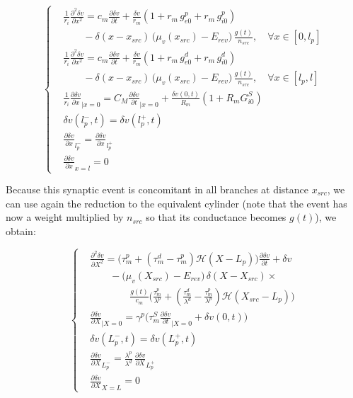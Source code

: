\documentclass[colorlinks]{article}
\begin{document}
\begin{equation}
\label{eq:psp-equation}
\left\{
\begin{split}
& \frac{1}{r_i} \frac{\partial^2 \delta v}{\partial x^2} = 
c_m \frac{\partial \delta v}{\partial t} 
+ \frac{\delta v}{r_m} (1 + r_m \, g_{e0}^p + r_m \, g_{i0}^p) \\
& \qquad - \delta(x-x_{src}) \, \big(\mu_v(x_{src})-E_{rev}\big) \, \frac{g(t)}{n_{src}},
\quad \forall x \in [0,l_p] \\
& \frac{1}{r_i} \frac{\partial^2 \delta v}{\partial x^2} = 
c_m \frac{\partial \delta v}{\partial t} 
+ \frac{\delta v}{r_m} (1 + r_m \, g_{e0}^d + r_m \, g_{i0}^d) \\
& \qquad
- \delta(x-x_{src}) \, \big(\mu_v(x_{src})-E_{rev}\big) \, \frac{g(t)}{n_{src}},
\quad   \forall x \in [l_p,l]\\
& \frac{1}{r_i} \frac{\partial \delta v}{\partial x}_{|x=0} = 
 C_M \frac{\partial \delta  v}{\partial t}_{|x=0} +  
 \frac{ \delta v(0,t)}{R_m} ( 1+ R_m G_{i0}^S) \\
&  \delta v(l_p^-,t) = \delta v(l_p^+,t) \\
& \frac{\partial \delta v}{\partial x}_{l_p^-} 
= \frac{\partial \delta v}{\partial x}_{l_p^+} \\
& \frac{\partial \delta v}{\partial x}_{x=l} = 0
\end{split}
\right.
\end{equation}

Because this synaptic event is concomitant in all branches at distance
$x_{src}$, we can use again the reduction to the equivalent cylinder
(note that the event has now a weight multiplied by $n_{src}$ so that
its conductance becomes \(g(t)\)), we obtain:

\begin{equation}
\label{eq:psp-equation-reduced}
\left\{
\begin{split}
& \frac{\partial^2 \delta v}{\partial X^2} =
\big( \tau_m^p + (\tau_m^d-\tau_m^p) 
\mathcal{H}(X-L_p) \big) \frac{\partial \delta v}{\partial t} + \delta v \\
& \qquad - \big(\mu_v(X_{src})-E_{rev}\big) \,  \delta(X-X_{src}) \times \\
& \qquad \qquad \frac{g(t)}{c_m} 
  \big( \frac{\tau_m^p}{\lambda^p} +
  (\frac{\tau_m^d}{\lambda^d}-\frac{\tau_m^p}{\lambda^p}) 
\mathcal{H}(X_{src}-L_p) \big) \\
& \frac{\partial \delta v}{\partial X}_{|X=0} = 
 \gamma^p \big( \tau_m^S \frac{\partial \delta  v}{\partial t}_{|X=0} +  
 \delta v(0,t) \big) \\
& \delta v(L_p^-,t) = \delta v(L_p^+,t) \\
& \frac{\partial \delta v}{\partial X}_{L_p^-} 
= \frac{\lambda^p}{\lambda^d} \, 
\frac{\partial \delta v}{\partial X}_{L_p^+} \\
& \frac{\partial \delta v}{\partial X}_{X=L} = 0
\end{split}
\right.
\end{equation}
\end{document}
